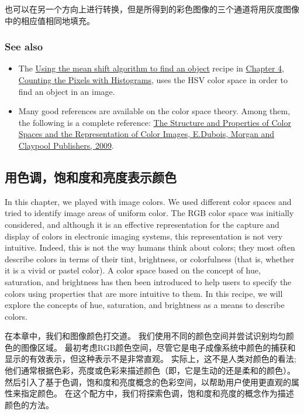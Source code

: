 \documentclass[]{article}
\begin{document}
也可以在另一个方向上进行转换，但是所得到的彩色图像的三个通道将用灰度图像中的相应值相同地填充。

\hypertarget{header-n1367}{%
\subsubsection{See also}\label{header-n1367}}

\begin{itemize}
\item
  The \href{}{Using the mean shift algorithm to find an object} recipe
  in \protect\hyperlink{ch4}{Chapter 4, Counting the Pixels with
  Histograms}, uses the HSV color space in order to find an object in an
  image.
\item
  Many good references are available on the color space theory. Among
  them, the following is a complete reference: \href{}{The Structure and
  Properties of Color Spaces and the Representation of Color Images,
  E.Dubois, Morgan and Claypool Publishers, 2009}. 
\end{itemize}

\hypertarget{header-n1374}{%
\subsection{用色调，饱和度和亮度表示颜色}\label{header-n1374}}

In this chapter, we played with image colors. We used different color
spaces and tried to identify image areas of uniform color. The RGB color
space was initially considered, and although it is an effective
representation for the capture and display of colors in electronic
imaging systems, this representation is not very intuitive. Indeed, this
is not the way humans think about colors; they most often describe
colors in terms of their tint, brightness, or colorfulness (that is,
whether it is a vivid or pastel color). A color space based on the
concept of hue, saturation, and brightness has then been introduced to
help users to specify the colors using properties that are more
intuitive to them. In this recipe, we will explore the concepts of hue,
saturation, and brightness as a means to describe colors.

在本章中，我们和图像颜色打交道。
我们使用不同的颜色空间并尝试识别均匀颜色的图像区域。
最初考虑RGB颜色空间，尽管它是电子成像系统中颜色的捕获和显示的有效表示，但这种表示不是非常直观。
实际上，这不是人类对颜色的看法;
他们通常根据色彩，亮度或色彩来描述颜色（即，它是生动的还是柔和的颜色）。
然后引入了基于色调，饱和度和亮度概念的色彩空间，以帮助用户使用更直观的属性来指定颜色。
在这个配方中，我们将探索色调，饱和度和亮度的概念作为描述颜色的方法。
\end{document}
